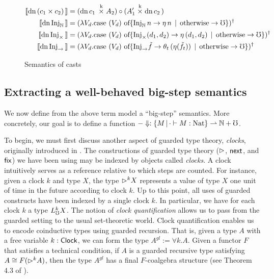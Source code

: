 \begin{figure*}
\begin{minipage}{0.3\textwidth}
\begin{footnotesize}
\begin{align*}
    \llbracket {\text{dn}\,{(c_1 \times c_2)}\,} \rrbracket &= (\text{dn}\,{c_1}\, \mathrel{\mathop{\times}\limits^{\textrm{k}}} A_2) \circ (A_1' \mathrel{\mathop{\times}\limits^{\textrm{k}}} \text{dn}\,{c_2}\,) \\
    \llbracket {\text{dn}\,{\text{Inj}_\mathbb{N}}\,} \rrbracket &= (
      \lambda V_d . \text{case $({V_d})$ of}
      \{ \text{Inj}_\mathbb{N}\,n \to \eta\, n
         \mathrel{\bf \,\mid\,} \text{otherwise} \to \mho \})^\dagger \\
    \llbracket {\text{dn}\,{\text{Inj}_\times}\,} \rrbracket &= (
      \lambda V_d . \text{case $({V_d})$ of}
      \{ \text{Inj}_\times(d_1, d_2) \to \eta\, (d_1, d_2)
         \mathrel{\bf \,\mid\,} \text{otherwise} \to \mho \})^\dagger \\
    \llbracket {\text{dn}\,{\text{Inj}_\to}\,} \rrbracket &= (
      \lambda V_d . \text{case $({V_d})$ of}
      \{ \text{Inj}_\to \tilde{f} \to \theta_t\, (\eta (\tilde{f}_t))
         \mathrel{\bf \,\mid\,} \text{otherwise} \to \mho \})^\dagger \\
  \end{align*}
    \end{footnotesize}
  \end{minipage}
  \caption{Semantics of casts}
  \label{fig:term-semantics}
\end{figure*}

\subsection{Extracting a well-behaved big-step semantics}\label{sec:big-step-term-semantics}


We now define from the above term model a ``big-step'' semantics. More
concretely, our goal is to define a function 
$-\Downarrow : \{M \,|\, \cdot \vdash M : \text{Nat} \} \rightharpoonup \mathbb{N} + {\mho}$.

To begin, we must first discuss another aspect of guarded type theory,
\emph{clocks}, originally introduced in \cite{atkey-mcbride2013}. The
constructions of guarded type theory (${\vartriangleright}$, $\mathsf{next}$, and $\mathsf{fix}$) we have been
using may be indexed by objects called \emph{clocks}. A clock intuitively serves
as a reference relative to which steps are counted. For instance, given a clock
$k$ and type $X$, the type ${\vartriangleright}^k X$ represents a value of type $X$ one unit
of time in the future according to clock $k$.
%
Up to this point, all uses of guarded constructs have been indexed by a single
clock $k$. In particular, we have for each clock $k$ a type $L_\mho^k X$. The
notion of \emph{clock quantification} allows us to pass from the guarded setting
to the usual set-theoretic world. Clock quantification enables us to encode
coinductive types using guarded recursion. That is, given a type $A$ with a free
variable $k : \mathsf{Clock}$, we can form the type $A^{gl} := \forall k. A$. Given a
functor $F$ that satisfies a technical condition, if $A$ is a guarded recursive
type satisfying $A \cong F({\vartriangleright}^k A)$, then the type $A^{gl}$ has a final
$F$-coalgebra structure (see Theorem 4.3 of
\cite{kristensen-mogelberg-vezzosi2022}). 

